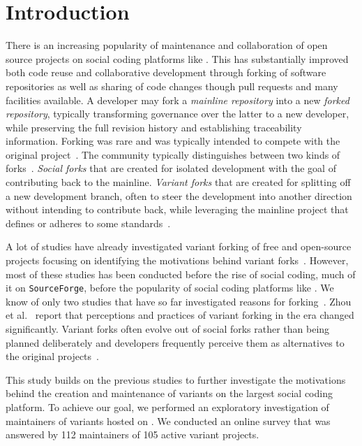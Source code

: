 \section{Introduction}
\label{sec:intro}
There is an increasing popularity of maintenance and collaboration of open source projects on social coding platforms like \gh. This has substantially improved both code reuse and collaborative development through forking of software repositories as well as sharing of code changes though pull requests and many \git facilities available.
A developer may fork a \textit{mainline repository} into a new \textit{forked repository}, typically transforming governance over the latter to a new developer, while preserving the full revision history and establishing traceability information. 
Forking was rare and was typically intended to compete with the original project~\cite{Linus:2012Perspectives,Gregorio:2012,Viseur:2012Forks,Linus:2013CodeForking,Linus:2011ToFork,Gamalielsson:2014Sustainability}.
The community typically distinguishes between two kinds of forks~\cite{Zhou:2020}.
\textit{Social forks} that are created for isolated development with the goal of contributing back to the mainline. \textit{Variant forks} that are created for splitting off a new development branch, often to steer the development into another direction without intending to contribute back, while leveraging the mainline project that defines or adheres to some standards~\cite{sung:ICSE:2020}.

A lot of studies have already investigated variant forking of free and open-source projects focusing on identifying the motivations behind variant forks~\cite{Linus:2012Perspectives,Gregorio:2012,Viseur:2012Forks,Linus:2013CodeForking,Linus:2011ToFork,Gamalielsson:2014Sustainability}. However, most of these studies has been conducted before the rise of social coding, much of it on \texttt{SourceForge}, before the popularity of social coding platforms like \gh. 
We know of only two studies that have so far investigated reasons for forking~\cite{businge:2018icsme,Zhou:2020}. Zhou et al.~\cite{Zhou:2020} report that perceptions and practices of variant forking in the \gh era changed significantly. Variant forks often evolve out of social forks rather than being planned deliberately and developers frequently perceive them as alternatives to the original projects~\cite{Zhou:2020}.

This study builds on the previous studies to further investigate the motivations behind the creation and maintenance of variants on \gh the largest social coding platform. To achieve our goal, we performed an exploratory investigation of maintainers of variants hosted on \gh. We conducted an online survey that was answered by 112 maintainers of 105 active variant projects.

